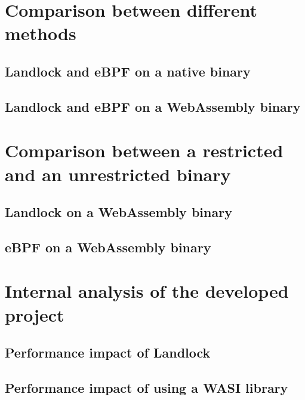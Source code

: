 \section{Comparison between different methods}

\subsection{Landlock and eBPF on a native binary}

\subsection{Landlock and eBPF on a WebAssembly binary}

\section{Comparison between a restricted and an unrestricted binary}

\subsection{Landlock on a WebAssembly binary}

\subsection{eBPF on a WebAssembly binary}

\section{Internal analysis of the developed project}

\subsection{Performance impact of Landlock}

\subsection{Performance impact of using a WASI library}